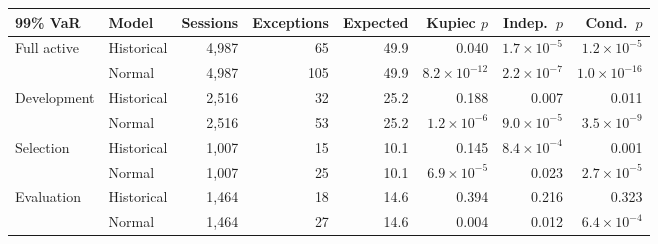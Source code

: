 \begin{tabular}{@{}llrrrrrr@{}}
\toprule
99\% VaR & Model & Sessions & Exceptions & Expected & Kupiec $p$ & Indep.\ $p$ & Cond.\ $p$ \\
\midrule
Full active & Historical & 4,987 & 65 & 49.9 & 0.040 & $1.7\times10^{-5}$ & $1.2\times10^{-5}$ \\
 & Normal & 4,987 & 105 & 49.9 & $8.2\times10^{-12}$ & $2.2\times10^{-7}$ & $1.0\times10^{-16}$ \\
\midrule
Development & Historical & 2,516 & 32 & 25.2 & 0.188 & 0.007 & 0.011 \\
 & Normal & 2,516 & 53 & 25.2 & $1.2\times10^{-6}$ & $9.0\times10^{-5}$ & $3.5\times10^{-9}$ \\
\midrule
Selection & Historical & 1,007 & 15 & 10.1 & 0.145 & $8.4\times10^{-4}$ & 0.001 \\
 & Normal & 1,007 & 25 & 10.1 & $6.9\times10^{-5}$ & 0.023 & $2.7\times10^{-5}$ \\
\midrule
Evaluation & Historical & 1,464 & 18 & 14.6 & 0.394 & 0.216 & 0.323 \\
 & Normal & 1,464 & 27 & 14.6 & 0.004 & 0.012 & $6.4\times10^{-4}$ \\
\bottomrule
\end{tabular}
